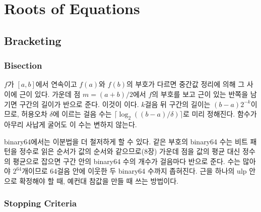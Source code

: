 \chapter{Roots of Equations}
\label{ch:roots}


\section{Bracketing}
\label{sec:bracket}

\subsection{Bisection}

$f$가 $[a,b]$에서 연속이고 $f(a)$와 $f(b)$의 부호가 다르면 중간값 정리에 의해 그 사이에 근이 있다. 가운데 점 $m=(a+b)/2$에서 $f$의 부호를 보고 근이 있는 반쪽을 남기면 구간의 길이가 반으로 준다. 이것이 이다. $k$걸음 뒤 구간의 길이는 $(b-a)2^{-k}$이므로, 허용오차 $\delta$에 이르는 걸음 수는 $\lceil\log_2((b-a)/\delta)\rceil$로 미리 정해진다. 함수가 아무리 사납게 굴어도 이 수는 변하지 않는다.

binary64에서는 이분법을 더 철저하게 할 수 있다. 같은 부호의 binary64 수는 비트 패턴을 정수로 읽은 순서가 값의 순서와 같으므로(8장) 가운데 점을 값의 평균 대신 정수의 평균으로 잡으면 구간 안의 binary64 수의 개수가 걸음마다 반으로 준다. 수는 많아야 $2^{64}$개이므로 $64$걸음 안에 이웃한 두 binary64 수까지 좁혀진다. 근을 하나의 ulp 안으로 확정해야 할 때, 예컨대 참값을 만들 때 쓰는 방법이다.

\subsection{Stopping Criteria}

